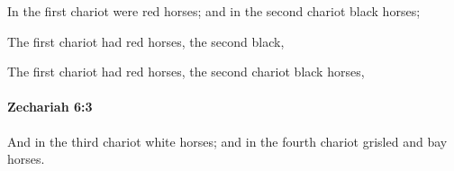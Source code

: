 			\begin{versebox}
					\item[BHS] 
					\item[LXX] 
					\item[ASV] In the first chariot were red horses; and in the second chariot black horses;
					\item[NIV] The first chariot had red horses, the second black,
					\item[NRSV] The first chariot had red horses, the second chariot black horses,
			\end{versebox}

		\paragraph{Zechariah 6:3} %
			\label{ZECHARIAH-6-3}

			And in the third chariot white horses; and in the fourth chariot grisled and bay horses.

